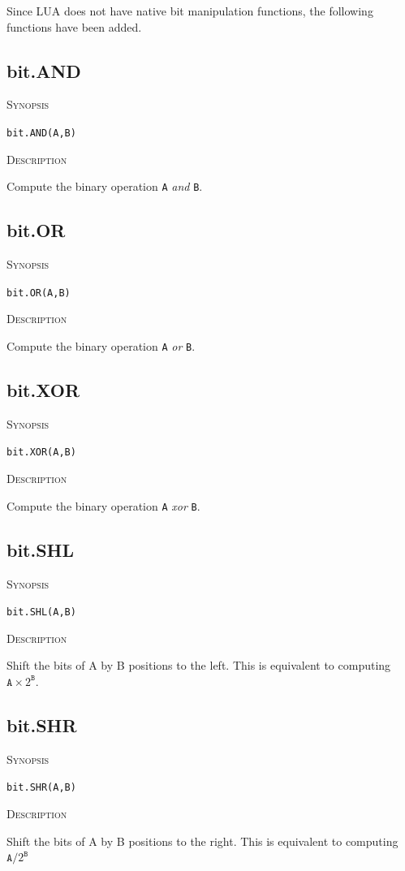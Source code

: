 \documentclass[11pt]{report}
\newcommand{\mansection}[1]{\vspace{0.5em}\par\noindent\textsc{#1}\vspace{0.5em}\par}
\begin{document}
Since LUA does not have native bit manipulation functions, the following functions have been added.

\subsection{bit.AND}

\mansection{Synopsis}
\texttt{bit.AND(A,B)}

\mansection{Description}
Compute the binary operation \texttt{A} \textit{and} \texttt{B}.

\subsection{bit.OR}

\mansection{Synopsis}
\texttt{bit.OR(A,B)}

\mansection{Description}
Compute the binary operation \texttt{A} \textit{or} \texttt{B}.

\subsection{bit.XOR}

\mansection{Synopsis}
\texttt{bit.XOR(A,B)}

\mansection{Description}
  Compute the binary operation \texttt{A} \textit{xor} \texttt{B}.

\subsection{bit.SHL}

\mansection{Synopsis}
\texttt{bit.SHL(A,B)}

\mansection{Description}
  Shift the bits of A by B positions to the left. 
  This is equivalent to computing $\texttt{A}{\times}2^{\texttt{B}}$.

\subsection{bit.SHR}

\mansection{Synopsis}
\texttt{bit.SHR(A,B)}

\mansection{Description}
  Shift the bits of A by B positions to the right. 
  This is equivalent to computing $\texttt{A}/2^{\texttt{B}}$
\end{document}
